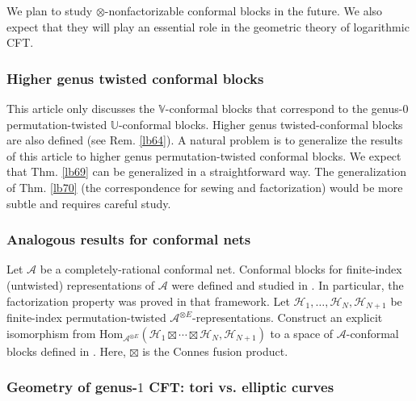 \documentclass[12pt,a4paper,notitlepage]{article}
\theoremstyle{definition}
\theoremstyle{plain}
\newcommand{\mc}{\mathcal}
\newcommand{\Hom}{\mathrm{Hom}}
\newcommand{\Vbb}{\mathbb V}
\newcommand{\Ubb}{\mathbb U}
\numberwithin{equation}{subsection}
\begin{document}
We plan to study $\otimes$-nonfactorizable conformal blocks in the future. We also expect that they will play an essential role in the geometric theory of logarithmic CFT.







\subsubsection*{Higher genus twisted conformal blocks}

This article only discusses the $\Vbb$-conformal blocks that correspond to the genus-$0$ permutation-twisted $\Ubb$-conformal blocks. Higher genus twisted-conformal blocks are also defined (see Rem. \ref{lb64}). A natural problem is to generalize the results of this article to higher genus permutation-twisted conformal blocks. We expect that Thm. \ref{lb69} can be generalized in a straightforward way. The generalization of Thm. \ref{lb70} (the correspondence for sewing and factorization) would be more subtle and requires careful study.


\subsubsection*{Analogous results for conformal nets}


Let $\mc A$ be a completely-rational conformal net. Conformal blocks for finite-index (untwisted) representations of $\mc A$ were defined and studied in \cite{BDH17}. In particular, the factorization property was proved in that framework. Let $\mc H_1,\dots,\mc H_N,\mc H_{N+1}$ be finite-index permutation-twisted $\mc A^{\otimes E}$-representations. Construct an explicit isomorphism from $\Hom_{\mc A^{\otimes E}}(\mc H_1\boxtimes\cdots\boxtimes\mc H_N,\mc H_{N+1})$ to a space of $\mc A$-conformal blocks defined in \cite{BDH17}. Here, $\boxtimes$ is the Connes fusion product.


\subsubsection*{Geometry of genus-$1$  CFT: tori vs. elliptic curves}
\end{document}
